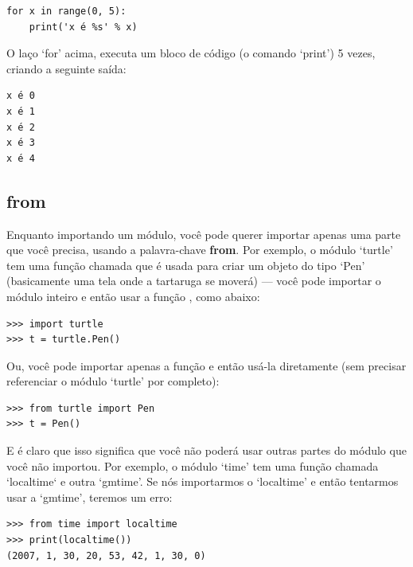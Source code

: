 \begin{listing}
\begin{verbatim}
for x in range(0, 5):
    print('x é %s' % x)
\end{verbatim}
\end{listing}

\noindent
O laço `for' acima, executa um bloco de código (o comando `print') 5 vezes, criando a seguinte saída:

\begin{listing}
\begin{verbatim}
x é 0
x é 1
x é 2
x é 3
x é 4
\end{verbatim}
\end{listing}

\subsection*{from}

Enquanto importando um módulo, você pode querer importar apenas uma parte que você precisa, usando a palavra-chave \textbf{from}. Por exemplo, o módulo `turtle' tem uma função chamada  que é usada para criar um objeto do tipo `Pen' (basicamente uma tela onde a tartaruga se moverá) --- você pode importar o módulo inteiro e então usar a função , como abaixo:

\begin{listingignore}
\begin{verbatim}
>>> import turtle
>>> t = turtle.Pen()
\end{verbatim}
\end{listingignore}

Ou, você pode importar apenas a função  e então usá-la diretamente (sem precisar referenciar o módulo `turtle' por completo):

\begin{listingignore}
\begin{verbatim}
>>> from turtle import Pen
>>> t = Pen()
\end{verbatim}
\end{listingignore}

E é claro que isso significa que você não poderá usar outras partes do módulo que você não importou. Por exemplo, o módulo `time' tem uma função chamada `localtime` e outra `gmtime'. Se nós importarmos o `localtime' e então tentarmos usar a `gmtime', teremos um erro:

\begin{listingignore}
\begin{verbatim}
>>> from time import localtime
>>> print(localtime())
(2007, 1, 30, 20, 53, 42, 1, 30, 0)
\end{verbatim}
\end{listingignore}


